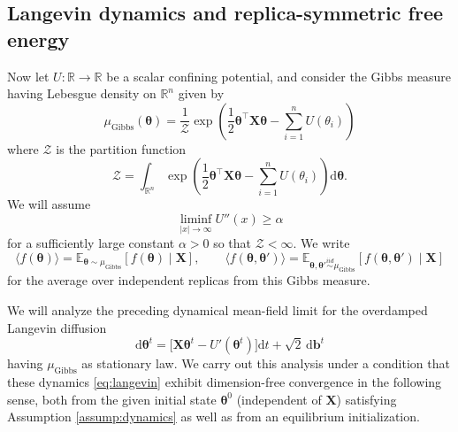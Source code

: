 \documentclass[11pt,letterpaper,reqno]{amsart}
\def\E{\mathbb{E}}
\def\R{\mathbb{R}}
\def\d{\mathrm{d}}
\def\btheta{\boldsymbol{\theta}}
\def\X{\mathbf{X}}
\def\Id{\mathrm{Id}}
\def\b{\mathbf{b}}
\def\cZ{\mathcal{Z}}
\def\Gibbs{\mathrm{Gibbs}}
\theoremstyle{definition}
\numberwithin{equation}{section}
\begin{document}
\subsection{Langevin dynamics and replica-symmetric free energy}

Now let $U:\R \to \R$ be a scalar confining potential, and consider the Gibbs
measure having Lebesgue density on $\R^n$ given by
\begin{equation}\label{eq:gibbsmeasure}
\mu_\Gibbs(\btheta)=\frac{1}{\cZ}\exp\left(\frac{1}{2}\btheta^\top \X\btheta
-\sum_{i=1}^n U(\theta_i)\right)
\end{equation}
where $\cZ$ is the partition function
\begin{equation}\label{eq:partition}
\cZ=\int_{\R^n} \exp\left(\frac{1}{2}\btheta^\top \X\btheta
-\sum_{i=1}^n U(\theta_i)\right)\d\btheta.
\end{equation}
We will assume
\begin{equation}\label{eq:Uconvexity}
\liminf_{|x| \to \infty} U''(x) \geq \alpha
\end{equation}
for a sufficiently large constant $\alpha>0$ so that $\cZ<\infty$.
We write
\[\langle f(\btheta) \rangle=\E_{\btheta \sim \mu_\Gibbs}
[f(\btheta) \mid \X], \qquad
\langle f(\btheta,\btheta') \rangle=\E_{\btheta,\btheta' \overset{iid}{\sim}
\mu_\Gibbs}[f(\btheta,\btheta') \mid \X]\]
for the average over independent replicas from this Gibbs measure.

We will analyze the preceding dynamical mean-field limit for the overdamped
Langevin diffusion
\begin{equation}\label{eq:langevin}
\d\btheta^t=\big[\X\btheta^t-U'(\btheta^t)\big]\d t+\sqrt{2}\,\d\b^t
\end{equation}
having $\mu_\Gibbs$ as stationary law. We carry out this analysis under
a condition that these dynamics
\eqref{eq:langevin} exhibit dimension-free convergence in the following sense,
both from the given initial state $\btheta^0$ (independent of $\X$) satisfying
Assumption \ref{assump:dynamics} as well as from an equilibrium initialization.
\end{document}
